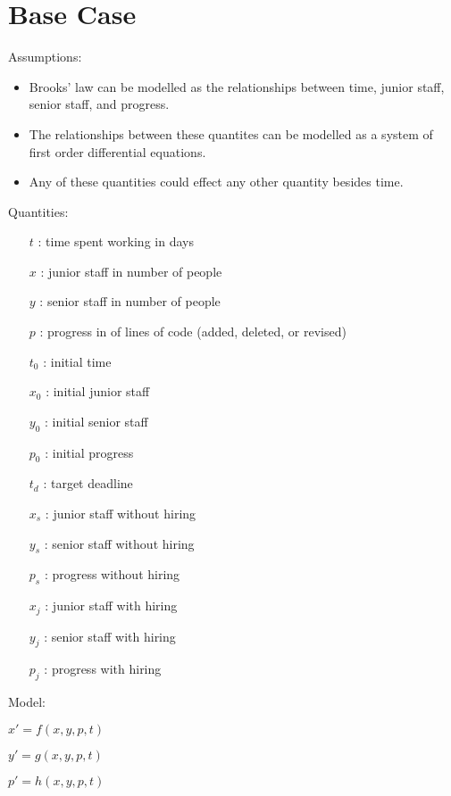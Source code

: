 \documentclass{article}
\newenvironment{atomize}
    {\begin{list} {} {
            \setlength\itemindent{0pt}
            \setlength\leftmargin{10pt}
            \setlength\labelwidth{0pt}
    }}
    {\end{list}}
\begin{document}
\section*{Base Case}
  \begin{atomize}
    \item Assumptions:
      \begin{itemize}
				\item Brooks' law can be modelled as the relationships between
				time, junior staff, senior staff, and progress.
				\item The relationships between these quantites can be modelled
				as a system of first order differential equations.
				\item Any of these quantities could effect any other quantity besides
				time.  
        \end{itemize}

    \item Quantities:
      \begin{itemize}
        \item [$t$]: time spent working in days
        \item [$x$]: junior staff in number of people
        \item [$y$]: senior staff in number of people
        \item [$p$]: progress in of lines of code (added, deleted, or revised)
        \item [$t_{0}$]: initial time
        \item [$x_{0}$]: initial junior staff
        \item [$y_{0}$]: initial senior staff
        \item [$p_{0}$]: initial progress
        \item [$t_{d}$]: target deadline
				\item [$x_{s}$]: junior staff without hiring
				\item [$y_{s}$]: senior staff without hiring
        \item [$p_{s}$]: progress without hiring
        \item [$x_{j}$]: junior staff with hiring
				\item [$y_{j}$]: senior staff with hiring
        \item [$p_{j}$]: progress with hiring
      \end{itemize}
	
    \item Model:
      \begin{atomize}
        \item $x\prime = f\left(x, y, p, t\right)$
        \item $y\prime = g\left(x, y, p, t\right)$
        \item $p\prime = h\left(x, y, p, t\right)$
      \end{atomize}
  \end{atomize}
\end{document}
